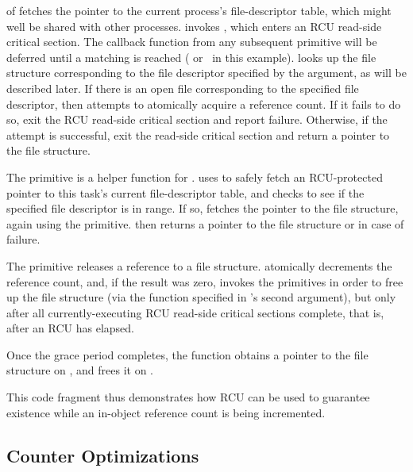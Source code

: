 \begin{fcvref}
 of  fetches the pointer to the current
process's file-descriptor table, which might well be shared
with other processes.
 invokes , which
enters an RCU read-side critical section.
The callback function from any subsequent  primitive
will be deferred until a matching  is reached
( or~ in this example).
 looks up the file structure corresponding to the file
descriptor specified by the  argument, as will be
described later.
If there is an open file corresponding to the specified file descriptor,
then  attempts to atomically acquire a reference count.
If it fails to do so,  exit the RCU read-side critical
section and report failure.
Otherwise, if the attempt is successful, 
exit the read-side
critical section and return a pointer to the file structure.

The  primitive is a helper function for
.
 uses  to safely fetch an
RCU-protected pointer to this task's current file-descriptor table,
and  checks to see if the specified file descriptor is in range.
If so,  fetches the pointer to the file structure, again using
the  primitive.
 then returns a pointer to the file structure or 
in case of failure.

The  primitive releases a reference to a file structure.
 atomically decrements the reference count, and, if the
result was zero,  invokes the  primitives
in order to free up the file structure (via the 
function specified in 's second argument), but only after
all currently-executing RCU read-side critical sections complete, that
is, after an RCU  has elapsed.

Once the grace period completes, the  function
obtains a pointer to the file structure on , and frees it
on .
\end{fcvref}

This code fragment thus demonstrates how RCU can be used to guarantee
existence while an in-object reference count is being incremented.

\subsection{Counter Optimizations}
\label{sec:together:Counter Optimizations}

